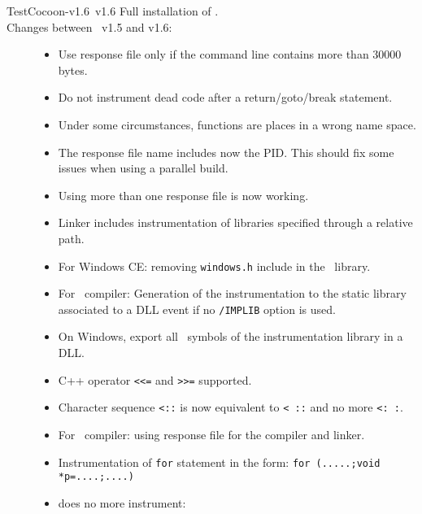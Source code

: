 \begin{TestCocoonDownload}
\begin{TestCocoonDownloadLink}
\end{TestCocoonDownloadLink}
\begin{ReleaseNote}{TestCocoon-v1.6}{\TestCocoon\ v1.6}
Full installation of \TestCocoon.\\
Changes between \TestCocoon\ v1.5 and v1.6:
\begin{description}
\item[\CoverageScanner]
  \begin{itemize}
    \item         Use response file only if the command line contains more than 30000 bytes.
    \item \NewFeature Do not instrument dead code after a return/goto/break statement.
    \item \BugFix Under some circumstances, functions are places in a wrong name space.
    \item \BugFix The response file name includes now the PID. This should fix some issues when using a parallel build.
    \item \BugFix Using more than one response file is now working.
    \item \BugFix Linker includes instrumentation of libraries specified through a relative path.
    \item \BugFix For Windows CE: removing \verb$windows.h$ include in the \CoverageScanner\ library.
    \item \BugFix For \VisualStudio\ compiler: Generation of the instrumentation to the static library associated to a DLL event if no \verb$/IMPLIB$ option is used.
    \item \BugFix On Windows, export all \CoverageScanner\ symbols of the instrumentation library in a DLL.
    \item \BugFix C++ operator \verb$<<=$ and \verb$>>=$ supported.
    \item \BugFix Character sequence \verb$<::$ is now equivalent to \verb$< ::$ and no more \verb$<: :$.
    \item \BugFix For \VisualStudio\ compiler: using response file for the compiler and linker.
    \item \BugFix Instrumentation of \verb$for$ statement in the form: \verb$for (.....;void *p=....;....)$
    \item \BugFix {} does no more instrument:

\end{itemize}
\end{description}
\end{ReleaseNote}
\end{TestCocoonDownload}
